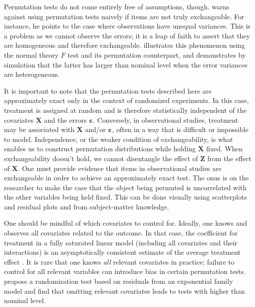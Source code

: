 \documentclass[11pt]{article}
\begin{document}
Permutation tests do not come entirely free of assumptions, though.  
\cite{romano_behavior_1990} warns against using permutation tests naively if items are not truly exchangeable. 
For instance, he points to the case where observations have unequal variances.  
This is a problem as we cannot observe the errors; it is a leap of faith to assert that they are homogeneous and therefore exchangeable.
\cite{boik_fisherpitman_1987} illustrates this phenomenon using the normal theory $F$ test and its permutation counterpart, 
and demonstrates by simulation that the latter has larger than nominal level when the error variances are heterogeneous.

It is important to note that the permutation tests described here are approximately exact only in the context of randomized experiments.
In this case, treatment is assigned at random and is therefore statistically independent of the covariates $\mathbf{X}$ and the errors $\mathbf{\varepsilon}$.
Conversely, in observational studies, treatment may be associated with $\mathbf{X}$ and/or $\mathbf{\varepsilon}$, often in a way that is difficult or impossible to model.
Independence, or the weaker condition of exchangeability, is what enables us to construct permutation distributions while holding $\mathbf{X}$ fixed.
When exchangeability doesn't hold, we cannot disentangle the effect of $\mathbf{Z}$ from the effect of $\mathbf{X}$.
One must provide evidence that items in observational studies are exchangeable in order to achieve an approximately exact test.
The onus is on the researcher to make the case that the object being permuted is uncorrelated with the other variables being held fixed.
This can be done visually using scatterplots and residual plots \cite{freedman_nonstochastic_1983} and from subject-matter knowledge.

One should be mindful of which covariates to control for.
Ideally, one knows and observes all covariates related to the outcome.
In that case, the coefficient for treatment in a fully saturated linear model (including all covariates and their interactions) is an asymptotically consistent estimate of the average treatment effect \cite{lin_agnostic_2013}.
It is rare that one knows \textit{all} relevant covariates in practice; failure to control for all relevant variables can introduce bias in certain permutation tests.
 \cite{gail_tests_1988} propose a randomization test based on residuals from an exponential family model and find that omitting relevant covariates leads to tests with higher than nominal level.
 
\end{document}
